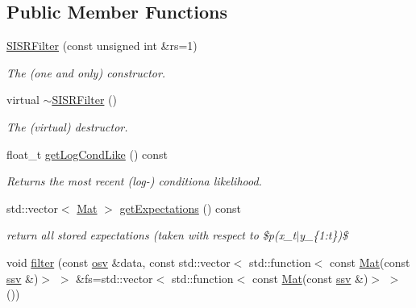 \subsection*{Public Member Functions}
\begin{DoxyCompactItemize}
\item 
\hyperlink{classSISRFilter_a3282cdeffd0f1e07e372212b330d7256}{S\+I\+S\+R\+Filter} (const unsigned int \&rs=1)
\begin{DoxyCompactList}\small\item\em The (one and only) constructor. \end{DoxyCompactList}\item 
\mbox{\label{classSISRFilter_a121b29498d8df63e962b9374613818ff}} 
virtual \hyperlink{classSISRFilter_a121b29498d8df63e962b9374613818ff}{$\sim$\+S\+I\+S\+R\+Filter} ()
\begin{DoxyCompactList}\small\item\em The (virtual) destructor. \end{DoxyCompactList}\item 
float\+\_\+t \hyperlink{classSISRFilter_ac1e812ed67ec3ed51a09f9c4bf215d88}{get\+Log\+Cond\+Like} () const
\begin{DoxyCompactList}\small\item\em Returns the most recent (log-\/) conditiona likelihood. \end{DoxyCompactList}\item 
std\+::vector$<$ \hyperlink{classSISRFilter_afca4a8c20de84bb2581e500954df0912}{Mat} $>$ \hyperlink{classSISRFilter_a9a96eff46d2c5e54402fd081b4a95fba}{get\+Expectations} () const
\begin{DoxyCompactList}\small\item\em return all stored expectations (taken with respect to \$p(x\+\_\+t$\vert$y\+\_\+\{1\+:t\})\$ \end{DoxyCompactList}\item 
void \hyperlink{classSISRFilter_a40a7033e04472f10511f731074db97a9}{filter} (const \hyperlink{classSISRFilter_a42325662bf3d057ccc3eaa75fa2f70f9}{osv} \&data, const std\+::vector$<$ std\+::function$<$ const \hyperlink{classSISRFilter_afca4a8c20de84bb2581e500954df0912}{Mat}(const \hyperlink{classSISRFilter_ada0fdfca451ed6a22a8bba48a881819d}{ssv} \&)$>$ $>$ \&fs=std\+::vector$<$ std\+::function$<$ const \hyperlink{classSISRFilter_afca4a8c20de84bb2581e500954df0912}{Mat}(const \hyperlink{classSISRFilter_ada0fdfca451ed6a22a8bba48a881819d}{ssv} \&)$>$ $>$())

\end{DoxyCompactItemize}
